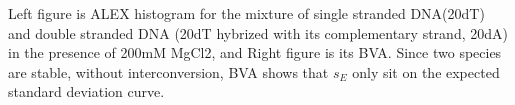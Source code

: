 \label{fig:bva_static} Left figure is ALEX histogram for the mixture of single stranded DNA(20dT) and double stranded DNA (20dT hybrized with its complementary strand, 20dA) in the presence of 200mM MgCl2, and Right figure is its BVA. Since two species are stable, without interconversion, BVA shows that $s_E$ only sit on the expected standard deviation curve.   